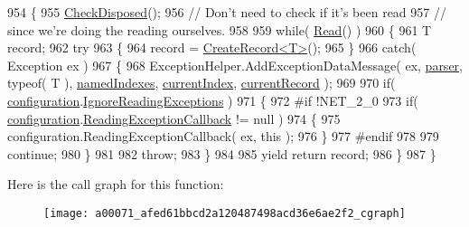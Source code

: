 \begin{DoxyCode}
954         \{
955             \hyperlink{a00071_a6fa45a46ed1322dc1872ca2321b5edbc}{CheckDisposed}();
956             \textcolor{comment}{// Don't need to check if it's been read}
957             \textcolor{comment}{// since we're doing the reading ourselves.}
958 
959             \textcolor{keywordflow}{while}( \hyperlink{a00071_af1f0d4d722e93df9da30fe60b89ff2d6}{Read}() )
960             \{
961                 T record;
962                 \textcolor{keywordflow}{try}
963                 \{
964                     record = \hyperlink{a00071_aadbd9b18761654925be4bed3b906faa1}{CreateRecord<T>}();
965                 \}
966                 \textcolor{keywordflow}{catch}( Exception ex )
967                 \{
968                     ExceptionHelper.AddExceptionDataMessage( ex, \hyperlink{a00071_aaf2ee64c7a157027aea69bfae1fa9edc}{parser}, typeof( T ), 
      \hyperlink{a00071_a3114f49bd2b3c4966f4b15a310747aeb}{namedIndexes}, \hyperlink{a00071_a56e974bc7e2242912e956393e831e166}{currentIndex}, \hyperlink{a00071_ab2bfef15784add66e441c9d3a0d73751}{currentRecord} );
969 
970                     \textcolor{keywordflow}{if}( \hyperlink{a00071_a695622911e45cbac8d67dcbd9a3e2967}{configuration}.\hyperlink{a00057_a8645dbd4fe2a9c443910695a93b1027f}{IgnoreReadingExceptions} )
971                     \{
972 \textcolor{preprocessor}{#if !NET\_2\_0
}
973 \textcolor{preprocessor}{}                        \textcolor{keywordflow}{if}( \hyperlink{a00071_a695622911e45cbac8d67dcbd9a3e2967}{configuration}.\hyperlink{a00057_ae7257970a1b5bfb9f2ddfdc61a70fe34}{ReadingExceptionCallback} != 
      null )
974                         \{
975                             configuration.ReadingExceptionCallback( ex, this );
976                         \}
977 \textcolor{preprocessor}{#endif
}
978 \textcolor{preprocessor}{}
979                         \textcolor{keywordflow}{continue};
980                     \}
981 
982                     \textcolor{keywordflow}{throw};
983                 \}
984 
985                 yield \textcolor{keywordflow}{return} record;
986             \}
987         \}
\end{DoxyCode}


Here is the call graph for this function\-:
\nopagebreak
\begin{figure}[H]
\begin{center}
\leavevmode
\texttt{[image: a00071\_afed61bbcd2a120487498acd36e6ae2f2\_cgraph]}
\end{center}
\end{figure}


